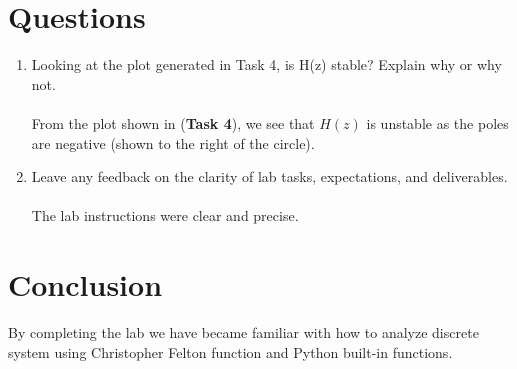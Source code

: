 \documentclass[12pt,a4paper]{article}
\begin{document}
\section{Questions}\label{sec:res}
\begin{enumerate}
    \item 
    Looking at the plot generated in Task 4, is H(z) stable? Explain why or why not.\\
    
    \\From the plot shown in (\textbf{Task 4}), we see that $H(z)$ is unstable as the poles are negative (shown to the right of the circle).\\
    
    \item Leave any feedback on the clarity of lab tasks, expectations, and deliverables.\\
    
    \\The lab instructions were clear and precise.
\end{enumerate}

\section{Conclusion}\label{sec:res}
    
    By completing the lab we have became familiar with how to analyze discrete system using Christopher Felton function and Python built-in functions.
 


\end{document}
